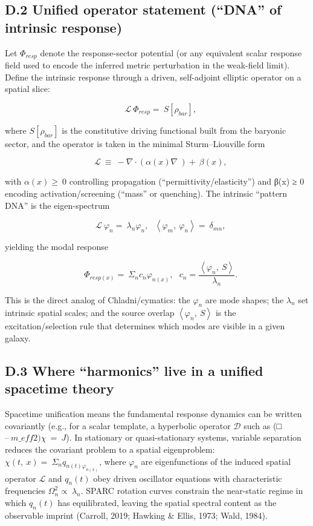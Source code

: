 \subsection{D.2 Unified operator statement (``DNA'' of intrinsic response)}\label{d.2-unified-operator-statement-dna-of-intrinsic-response}

Let \(\Phi_{resp}\) denote the response-sector potential (or any equivalent scalar response field used to encode the inferred metric perturbation in the weak-field limit). Define the intrinsic response through a driven, self-adjoint elliptic operator on a spatial slice:

\[\ \ \ \ \mathcal{L}\ \Phi_{resp} = \ S\left\lbrack \rho_{bar} \right\rbrack,\]

where \(S\left\lbrack \rho_{bar} \right\rbrack\) is the constitutive driving functional built from the baryonic sector, and the operator is taken in the minimal Sturm--Liouville form

\[\ \ \ \ \mathcal{L}\  \equiv \  - \nabla \cdot \left( \alpha(x)\nabla\  \right) + \ \beta(x),\]

with \(\alpha(x) \geq \ 0\) controlling propagation (``permittivity/elasticity'') and β(x) ≥ 0 encoding activation/screening (``mass'' or quenching). The intrinsic ``pattern DNA'' is the eigen-spectrum

\[\ \ \ \ \mathcal{L}\ \varphi_{n} = \ \lambda_{n}\varphi_{n},\ \ \ \left\langle \varphi_{m},\ \varphi_{n} \right\rangle = \ \delta_{mn},\]

yielding the modal response

\[\ \ \ \ \Phi_{resp(x)} = \ \Sigma_{n}c_{n}\varphi_{n(x)},\ \ \ c_{n} = \frac{\left\langle \varphi_{n},\ S \right\rangle}{\lambda_{n}}.\]

This is the direct analog of Chladni/cymatics: the \(\varphi_{n}\) are mode shapes; the \(\lambda_{n}\) set intrinsic spatial scales; and the source overlap \(\left\langle \varphi_{n},\ S \right\rangle\) is the excitation/selection rule that determines which modes are visible in a given galaxy.

\subsection{D.3 Where ``harmonics'' live in a unified spacetime theory}\label{d.3-where-harmonics-live-in-a-unified-spacetime-theory}

Spacetime unification means the fundamental response dynamics can be written covariantly (e.g., for a scalar template, a hyperbolic operator \(\mathcal{D}\) such as (□ \(–\ m\_ eff\hat{}2)\chi\  = \ J\)). In stationary or quasi-stationary systems, variable separation reduces the covariant problem to a spatial eigenproblem: \(\chi(t,\ x) = \ \Sigma_{n}q_{n(t)\varphi_{n(x)}}\), where \(\varphi_{n}\) are eigenfunctions of the induced spatial operator \(\mathcal{L}\) and \(q_{n}(t)\) obey driven oscillator equations with characteristic frequencies \(\Omega_{n}^{2} \propto \ \lambda_{n}\). SPARC rotation curves constrain the near-static regime in which \(q_{n}(t)\) has equilibrated, leaving the spatial spectral content as the observable imprint (Carroll, 2019; Hawking \& Ellis, 1973; Wald, 1984).

